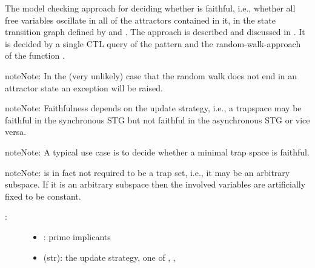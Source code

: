 \documentclass[letterpaper,10pt,english]{sphinxmanual}
\begin{document}
\begin{fulllineitems}
\label{\detokenize{Attractors:PyBoolNet.Attractors.faithfulness}}
The model checking approach for deciding whether  is faithful,
i.e., whether all free variables oscillate in all of the attractors contained in it,
in the state transition graph defined by  and .
The approach is described and discussed in {\hyperref[\detokenize{Bibliography:klarner2015trap}]{}}.
It is decided by a single CTL query of the pattern 
and the random-walk-approach of the function {\hyperref[\detokenize{StateTransitionGraphs:random-walk}]{}}.

\begin{sphinxadmonition}{note}{Note:}
In the (very unlikely) case that the random walk does not end in an attractor state an exception will be raised.
\end{sphinxadmonition}

\begin{sphinxadmonition}{note}{Note:}
Faithfulness depends on the update strategy, i.e.,
a trapspace may be faithful in the synchronous STG but not faithful in the asynchronous STG or vice versa.
\end{sphinxadmonition}

\begin{sphinxadmonition}{note}{Note:}
A typical use case is to decide whether a minimal trap space is faithful.
\end{sphinxadmonition}

\begin{sphinxadmonition}{note}{Note:}
 is in fact not required to be a trap set, i.e., it may be an arbitrary subspace.
If it is an arbitrary subspace then the involved variables are artificially fixed to be constant.
\end{sphinxadmonition}
\begin{description}
\item[{:}] \leavevmode\begin{itemize}
\item {} 
: prime implicants

\item {} 
 (str): the update strategy, one of , , 


\end{itemize}
\end{description}
\end{fulllineitems}
\end{document}
